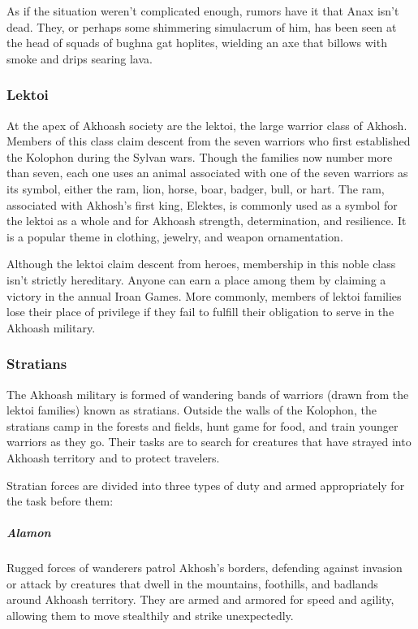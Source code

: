         As if the situation weren't complicated enough, rumors have it that Anax isn't dead.
        They, or perhaps some shimmering simulacrum of him, has been seen at the head of squads of bughna gat hoplites, wielding an axe that billows with smoke and drips searing lava.

    \subsubsection{Lektoi}
        At the apex of Akhoash society are the lektoi, the large warrior class of Akhosh.
        Members of this class claim descent from the seven warriors who first established the Kolophon during the Sylvan wars.
        Though the families now number more than seven, each one uses an animal associated with one of the seven warriors as its symbol, either the ram, lion, horse, boar, badger, bull, or hart.
        The ram, associated with Akhosh's first king, Elektes, is commonly used as a symbol for the lektoi as a whole and for Akhoash strength, determination, and resilience.
        It is a popular theme in clothing, jewelry, and weapon ornamentation. %

        Although the lektoi claim descent from heroes, membership in this noble class isn't strictly hereditary.
        Anyone can earn a place among them by claiming a victory in the annual Iroan Games.
        More commonly, members of lektoi families lose their place of privilege if they fail to fulfill their obligation to serve in the Akhoash military.

    \subsubsection{Stratians}
        The Akhoash military is formed of wandering bands of warriors (drawn from the lektoi families) known as stratians.
        Outside the walls of the Kolophon, the stratians camp in the forests and fields, hunt game for food, and train younger warriors as they go.
        Their tasks are to search for creatures that have strayed into Akhoash territory and to protect travelers.

        Stratian forces are divided into three types of duty and armed appropriately for the task before them:

        \subparagraph{Alamon} Rugged forces of wanderers patrol Akhosh's borders, defending against invasion or attack by creatures that dwell in the mountains, foothills, and badlands around Akhoash territory.
        They are armed and armored for speed and agility, allowing them to move stealthily and strike unexpectedly.

